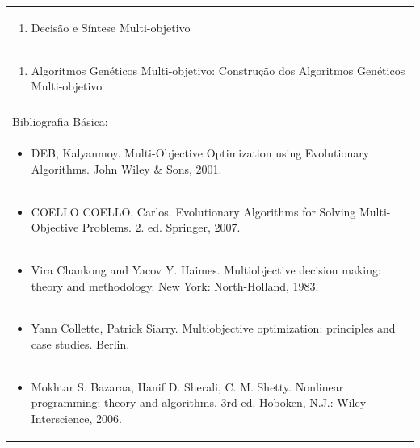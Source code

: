 \documentclass[11pt]{article}
\begin{document}
\begin{center}
\begin{longtable}{|p{4cm}|p{4cm}|p{4cm}|p{4cm}|}
\multicolumn{4}{|p{\dimexpr 16cm + 6\tabcolsep\relax}|}{\begin{enumerate}[start=7]\item Decisão e Síntese Multi-objetivo\end{enumerate}}\\
\multicolumn{4}{|p{\dimexpr 16cm + 6\tabcolsep\relax}|}{\begin{enumerate}[start=8]\item Algoritmos Genéticos Multi-objetivo: Construção dos Algoritmos Genéticos Multi-objetivo\end{enumerate}}\\
\multicolumn{4}{|p{\dimexpr 16cm + 6\tabcolsep\relax}|}{}\\
\hline
\multicolumn{4}{|p{16cm}|}{Bibliografia Básica:}\\*
\multicolumn{4}{|p{\dimexpr 16cm + 6\tabcolsep\relax}|}{\begin{itemize}\item DEB, Kalyanmoy. Multi-Objective Optimization using Evolutionary Algorithms. John Wiley \& Sons, 2001.\end{itemize}}\\
\multicolumn{4}{|p{\dimexpr 16cm + 6\tabcolsep\relax}|}{\begin{itemize}\item COELLO COELLO, Carlos. Evolutionary Algorithms for Solving Multi-Objective Problems. 2. ed. Springer, 2007.\end{itemize}}\\
\multicolumn{4}{|p{\dimexpr 16cm + 6\tabcolsep\relax}|}{\begin{itemize}\item Vira Chankong and Yacov Y. Haimes. Multiobjective decision making: theory and methodology. New York: North-Holland, 1983.\end{itemize}}\\
\multicolumn{4}{|p{\dimexpr 16cm + 6\tabcolsep\relax}|}{\begin{itemize}\item Yann Collette, Patrick Siarry. Multiobjective optimization: principles and case studies. Berlin.\end{itemize}}\\
\multicolumn{4}{|p{\dimexpr 16cm + 6\tabcolsep\relax}|}{\begin{itemize}\item Mokhtar S. Bazaraa, Hanif D. Sherali, C. M. Shetty. Nonlinear programming: theory and algorithms. 3rd ed. Hoboken, N.J.: Wiley-Interscience, 2006.\end{itemize}}\\

\end{longtable}
\end{center}
\end{document}
